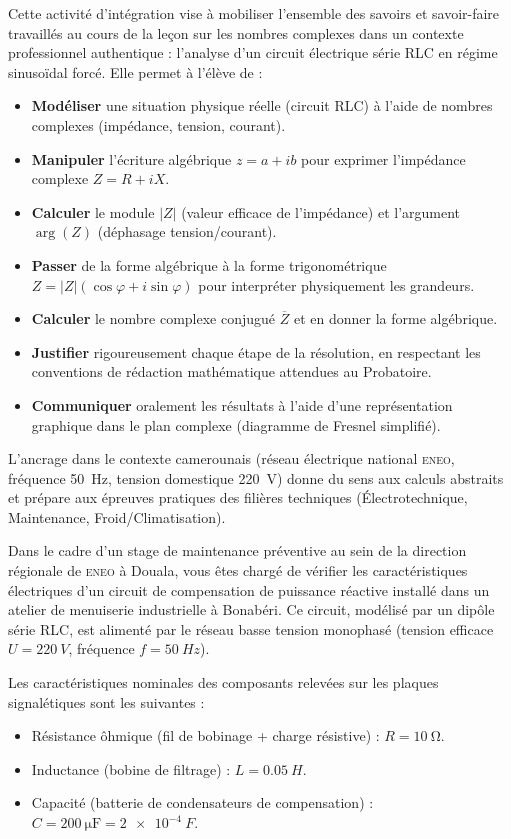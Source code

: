 \documentclass[11pt]{article}
\newcounter{popsec}
\newcounter{popsub}
\newcommand{\courssub}[1]{%
  \stepcounter{popsub}%
  \par\vspace{9pt}\noindent{\popxbold\fontsize{11.5}{13}\selectfont\color{popink}{\color{poporange}\thepopsec.\thepopsub}\hspace{6pt}#1}\par\nopagebreak\vspace{4pt}
}
\begin{document}
Cette activité d'intégration vise à mobiliser l'ensemble des savoirs et savoir-faire travaillés au cours de la leçon sur les nombres complexes dans un contexte professionnel authentique : l'analyse d'un circuit électrique série RLC en régime sinusoïdal forcé. Elle permet à l'élève de :
\begin{itemize}
    \item \textbf{Modéliser} une situation physique réelle (circuit RLC) à l'aide de nombres complexes (impédance, tension, courant).
    \item \textbf{Manipuler} l'écriture algébrique $z = a + ib$ pour exprimer l'impédance complexe $Z = R + iX$.
    \item \textbf{Calculer} le module $|Z|$ (valeur efficace de l'impédance) et l'argument $\arg(Z)$ (déphasage tension/courant).
    \item \textbf{Passer} de la forme algébrique à la forme trigonométrique $Z = |Z|(\cos\varphi + i\sin\varphi)$ pour interpréter physiquement les grandeurs.
    \item \textbf{Calculer} le nombre complexe conjugué $\overline{Z}$ et en donner la forme algébrique.
    \item \textbf{Justifier} rigoureusement chaque étape de la résolution, en respectant les conventions de rédaction mathématique attendues au Probatoire.
    \item \textbf{Communiquer} oralement les résultats à l'aide d'une représentation graphique dans le plan complexe (diagramme de Fresnel simplifié).
\end{itemize}
L'ancrage dans le contexte camerounais (réseau électrique national \textsc{eneo}, fréquence \SI{50}{Hz}, tension domestique \SI{220}{V}) donne du sens aux calculs abstraits et prépare aux épreuves pratiques des filières techniques (Électrotechnique, Maintenance, Froid/Climatisation).

\courssub{Situation}

Dans le cadre d'un stage de maintenance préventive au sein de la direction régionale de \textsc{eneo} à Douala, vous êtes chargé de vérifier les caractéristiques électriques d'un circuit de compensation de puissance réactive installé dans un atelier de menuiserie industrielle à Bonabéri. Ce circuit, modélisé par un dipôle série RLC, est alimenté par le réseau basse tension monophasé (tension efficace $U = \SI{220}{V}$, fréquence $f = \SI{50}{Hz}$).

Les caractéristiques nominales des composants relevées sur les plaques signalétiques sont les suivantes :
\begin{itemize}
    \item Résistance ôhmique (fil de bobinage + charge résistive) : $R = \SI{10}{\ohm}$.
    \item Inductance (bobine de filtrage) : $L = \SI{0,05}{H}$.
    \item Capacité (batterie de condensateurs de compensation) : $C = \SI{200}{\micro\farad} = \SI{2e-4}{F}$.
\end{itemize}
\end{document}
